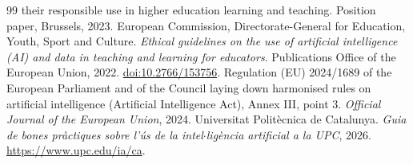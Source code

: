 \documentclass[11pt]{article}
\begin{document}
\begin{thebibliography}{99}
{their responsible use in higher education learning and teaching}. Position paper,
Brussels, 2023.
 European Commission, Directorate-General for Education, Youth, Sport and
Culture. \emph{Ethical guidelines on the use of artificial intelligence (AI) and data in
teaching and learning for educators}. Publications Office of the European Union, 2022.
\href{https://data.europa.eu/doi/10.2766/153756}{doi:10.2766/153756}.
 Regulation (EU) 2024/1689 of the European Parliament and of the Council
laying down harmonised rules on artificial intelligence (Artificial Intelligence Act),
Annex III, point 3. \emph{Official Journal of the European Union}, 2024.
 Universitat Polit\`ecnica de Catalunya. \emph{Guia de bones pr\`actiques
sobre l'\'us de la intel$\cdot$lig\`encia artificial a la UPC}, 2026.
\url{https://www.upc.edu/ia/ca}.
\end{thebibliography}
\end{document}
